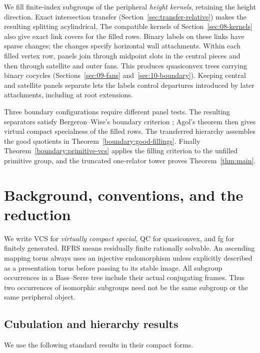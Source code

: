 We fill finite-index subgroups of the peripheral \emph{height
kernels}, retaining the height direction. Exact intersection transfer
(Section~\ref{sec:transfer-relative}) makes the resulting splitting
acylindrical. The compatible kernels of Section~\ref{sec:08-kernels}
also give exact link covers for the filled rows. Binary labels on
these links have sparse changes; the changes specify horizontal wall
attachments. Within each filled vertex row, panels join through
midpoint slots in the central pieces and then through satellite and
outer fans. This produces quasiconvex trees carrying binary cocycles
(Sections~\ref{sec:09-fans} and~\ref{sec:10-boundary}). Keeping central
and satellite panels separate lets the labels control departures
introduced by later attachments, including at root extensions.

Three boundary configurations require different panel tests. The
resulting separators satisfy Bergeron--Wise's boundary criterion
\cite[Theorem~1.4]{BergeronWise2012}; Agol's theorem then gives virtual
compact specialness of the filled rows. The transferred hierarchy
assembles the good quotients in Theorem~\ref{boundary:good-fillings}.
Finally Theorem~\ref{boundary:primitive-vcs} applies the filling
criterion to the unfilled primitive group, and the truncated
one-relator tower proves Theorem~\ref{thm:main}.

\section{Background, conventions, and the reduction}\label{sec:background}

We write VCS for \emph{virtually compact special}, QC for quasiconvex, and fg for finitely generated. RFRS means residually finite rationally solvable. An ascending mapping torus always uses an injective endomorphism unless explicitly described as a presentation torus before passing to its stable image. All subgroup occurrences in a Bass--Serre tree include their actual conjugating frames. Thus two occurrences of isomorphic subgroups need not be the same subgroup or the same peripheral object.

\subsection{Cubulation and hierarchy results}

We use the following standard results in their compact forms.

